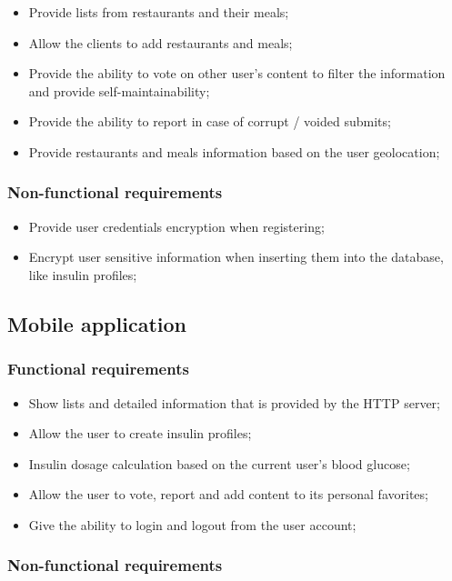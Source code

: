 \begin{itemize}
    \item Provide lists from restaurants and their meals;
    \item Allow the clients to add restaurants and meals;
    \item Provide the ability to vote on other user's content to filter the information and provide self-maintainability;
    \item Provide the ability to report in case of corrupt / voided submits;
    \item Provide restaurants and meals information based on the user geolocation;
\end{itemize}

\subsubsection{Non-functional requirements}

\begin{itemize}
    \item Provide user credentials encryption when registering;
    \item Encrypt user sensitive information when inserting them into the database, like insulin profiles;
\end{itemize}

\subsection{Mobile application}

\subsubsection{Functional requirements}

\begin{itemize}
    \item Show lists and detailed information that is provided by the HTTP server;
    \item Allow the user to create insulin profiles;
    \item Insulin dosage calculation based on the current user's blood glucose;
    \item Allow the user to vote, report and add content to its personal favorites;
    \item Give the ability to login and logout from the user account;
\end{itemize}

\subsubsection{Non-functional requirements}

